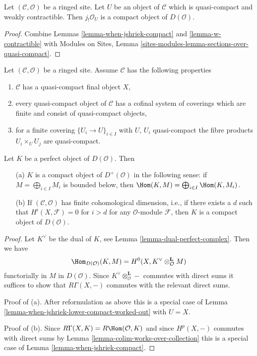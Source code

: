 \begin{lemma}
\label{lemma-quasi-compact-weakly-contractible-compact}
Let $(\mathcal{C}, \mathcal{O})$ be a ringed site. Let $U$
be an object of $\mathcal{C}$ which is quasi-compact and
weakly contractible. Then
$j_!\mathcal{O}_U$ is a compact object of $D(\mathcal{O})$.
\end{lemma}

\begin{proof}
Combine Lemmas \ref{lemma-when-jshriek-compact} and
\ref{lemma-w-contractible} with
Modules on Sites, Lemma \ref{sites-modules-lemma-sections-over-quasi-compact}.
\end{proof}

\begin{lemma}
\label{lemma-perfect-is-compact}
Let $(\mathcal{C}, \mathcal{O})$ be a ringed site. Assume
$\mathcal{C}$ has the following properties
\begin{enumerate}
\item $\mathcal{C}$ has a quasi-compact final object $X$,
\item every quasi-compact object of $\mathcal{C}$
has a cofinal system of coverings which are finite
and consist of quasi-compact objects,
\item for a finite covering $\{U_i \to U\}_{i \in I}$
with $U$, $U_i$ quasi-compact the fibre products $U_i \times_U U_j$ are
quasi-compact.
\end{enumerate}
Let $K$ be a perfect object of $D(\mathcal{O})$. Then
\begin{enumerate}
\item[(a)] $K$ is a compact object of $D^+(\mathcal{O})$
in the following sense: if $M = \bigoplus_{i \in I} M_i$ is
bounded below, then $\Hom(K, M) = \bigoplus_{i \in I} \Hom(K, M_i)$.
\item[(b)] If $(\mathcal{C}, \mathcal{O})$
has finite cohomological dimension, i.e., if there exists
a $d$ such that $H^i(X, \mathcal{F}) = 0$ for $i > d$ for
any $\mathcal{O}$-module $\mathcal{F}$, then
$K$ is a compact object of $D(\mathcal{O})$.
\end{enumerate}
\end{lemma}

\begin{proof}
Let $K^\vee$ be the dual of $K$, see
Lemma \ref{lemma-dual-perfect-complex}. Then we have
$$
\Hom_{D(\mathcal{O})}(K, M) =
H^0(X, K^\vee \otimes_\mathcal{O}^\mathbf{L} M)
$$
functorially in $M$ in $D(\mathcal{O})$.
Since $K^\vee \otimes_\mathcal{O}^\mathbf{L} -$ commutes with
direct sums it suffices
to show that $R\Gamma(X, -)$ commutes with the relevant direct sums.

\medskip\noindent
Proof of (a). After reformulation as above this is a special
case of Lemma \ref{lemma-when-jshriek-lower-compact-worked-out} with $U = X$.

\medskip\noindent
Proof of (b). Since $R\Gamma(X, K) = R\Hom(\mathcal{O}, K)$
and since $H^p(X, -)$ commutes with direct sums by
Lemma \ref{lemma-colim-works-over-collection}
this is a special case of
Lemma \ref{lemma-when-jshriek-compact}.
\end{proof}






